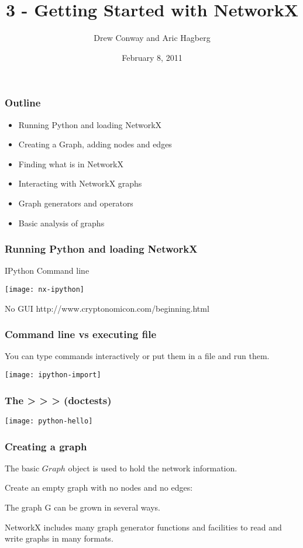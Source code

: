\documentclass[xcolor=dvipsnames, 9pt]{beamer}
\title{3 - Getting Started with NetworkX}
\author{Drew Conway and Aric Hagberg}
\date{February 8, 2011}
\begin{document}
\begin{frame}[plain]
\titlepage
\end{frame}

\begin{frame}
\frametitle{Outline}
\begin{itemize}
\item Running Python and loading NetworkX
\item Creating a Graph, adding nodes and edges
\item Finding what is in NetworkX
\item Interacting with NetworkX graphs
\item Graph generators and operators
\item Basic analysis of graphs
\end{itemize}
\end{frame}

\begin{frame}
\frametitle{Running Python and loading NetworkX}
IPython Command line 
\centerline{\texttt{[image: nx-ipython]}}
No GUI \footnotesize{http://www.cryptonomicon.com/beginning.html}
\end{frame}

\begin{frame}
\frametitle{Command line vs executing file}
You can type commands interactively or put them in a file and run them.
\centerline{\texttt{[image: ipython-import]}}
\end{frame}

\begin{frame}
\frametitle{The > > > (doctests)}
\centerline{\texttt{[image: python-hello]}}

\end{frame}

\begin{frame}
\frametitle{Creating a graph}

The basic $Graph$ object is used to hold the network information.

Create an empty graph with no nodes and no edges:

\begin{block}{}

\end{block}

The graph G can be grown in several ways.

NetworkX includes many graph generator functions 
and facilities to read and write graphs in many formats.
\end{frame}
\end{document}
